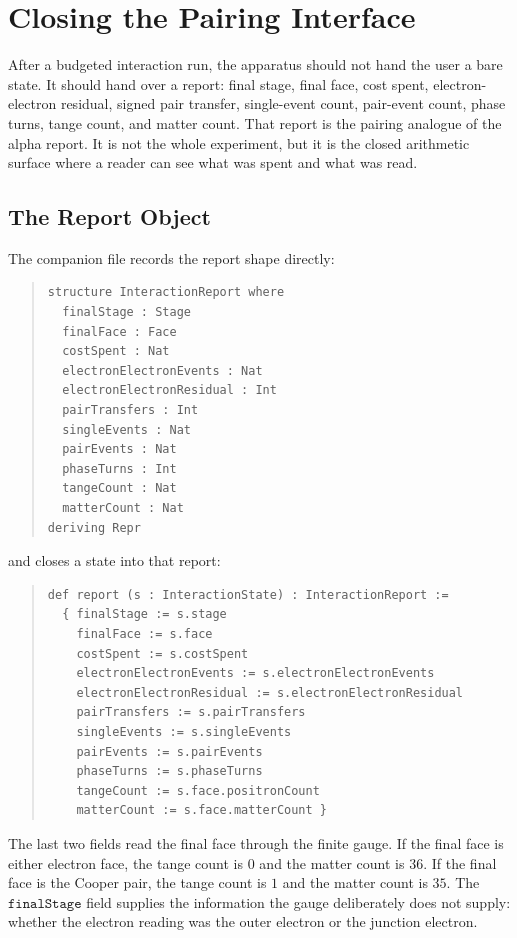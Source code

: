 \chapter{Closing the Pairing Interface}

After a budgeted interaction run, the apparatus should not hand the user a bare state. It should hand over a
report: final stage, final face, cost spent, electron-electron residual, signed pair transfer, single-event
count, pair-event count, phase turns, tange count, and matter count. That report is the pairing analogue of the
alpha report. It is not the whole experiment, but it is the closed arithmetic surface where a reader can see what
was spent and what was read.

\section{The Report Object}

The companion file records the report shape directly:

\begin{quote}\small
\begin{verbatim}
structure InteractionReport where
  finalStage : Stage
  finalFace : Face
  costSpent : Nat
  electronElectronEvents : Nat
  electronElectronResidual : Int
  pairTransfers : Int
  singleEvents : Nat
  pairEvents : Nat
  phaseTurns : Int
  tangeCount : Nat
  matterCount : Nat
deriving Repr
\end{verbatim}
\end{quote}

and closes a state into that report:

\begin{quote}\small
\begin{verbatim}
def report (s : InteractionState) : InteractionReport :=
  { finalStage := s.stage
    finalFace := s.face
    costSpent := s.costSpent
    electronElectronEvents := s.electronElectronEvents
    electronElectronResidual := s.electronElectronResidual
    pairTransfers := s.pairTransfers
    singleEvents := s.singleEvents
    pairEvents := s.pairEvents
    phaseTurns := s.phaseTurns
    tangeCount := s.face.positronCount
    matterCount := s.face.matterCount }
\end{verbatim}
\end{quote}

The last two fields read the final face through the finite gauge. If the final face is either electron face, the
tange count is \(0\) and the matter count is \(36\). If the final face is the Cooper pair, the tange count is
\(1\) and the matter count is \(35\). The \(\texttt{finalStage}\) field supplies the information the gauge
deliberately does not supply: whether the electron reading was the outer electron or the junction electron.


